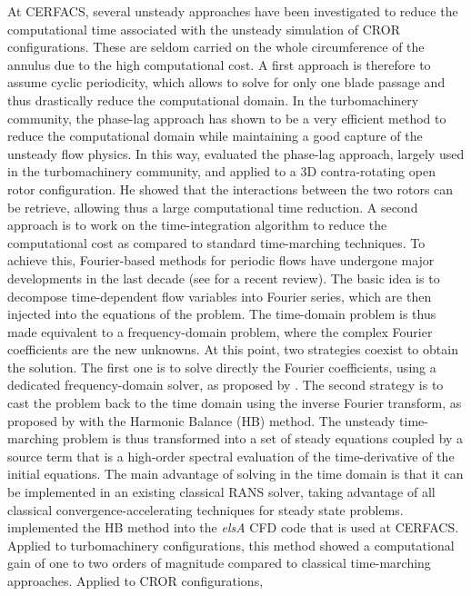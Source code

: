 At CERFACS, several unsteady approaches have been investigated 
to reduce the computational time associated with the unsteady simulation of 
CROR configurations. 
These are seldom carried on the whole
circumference of the annulus due to the high computational
cost. A first approach is therefore to assume cyclic periodicity,
which allows to solve for only one blade passage and thus drastically
reduce the computational domain. 
In the turbomachinery community, the phase-lag approach has shown to be
a very efficient method to reduce the computational domain while
maintaining a good capture of the unsteady flow physics. 
In this way, \citet{Burnazzi2010} evaluated the phase-lag approach, largely
used in the turbomachinery community, and
applied to a 3D contra-rotating open rotor configuration. He showed
that the interactions between the two rotors can be retrieve, allowing
thus a large computational time reduction.
A second approach 
is to work on the time-integration algorithm to reduce
the computational cost as compared to standard time-marching techniques. To achieve
this, Fourier-based methods for periodic flows have undergone major
developments in the last decade (see \citet{He2010} for a recent
review).  The basic idea is to decompose
time-dependent flow variables into Fourier series, which are then
injected into the equations of the problem. The time-domain problem is
thus made equivalent to a frequency-domain problem, where the complex
Fourier coefficients are the new unknowns. At this point, two
strategies coexist to obtain the solution. The first one is to solve
directly the Fourier coefficients, using a dedicated
frequency-domain solver, as proposed by \citet{He1998}. The second strategy is to cast the
problem back to the time domain using the inverse Fourier transform, as
proposed by \citet{Hall2002} with the Harmonic
Balance (HB) method. The unsteady time-marching problem is thus
transformed into a set of steady equations coupled by a source term
that is a high-order spectral evaluation of the time-derivative of the
initial equations. The main advantage of solving in the time domain is
that it can be implemented in an existing classical RANS solver,
taking advantage of all classical convergence-accelerating techniques
for steady state problems.
\citet{ThesisSicot} implemented
the HB method into the \emph{elsA} CFD code 
that is used at CERFACS. Applied to turbomachinery
configurations, this method showed a computational gain
of one to two orders of magnitude 
compared to classical time-marching approaches.
Applied to CROR configurations, \citet{Yabili2010}
